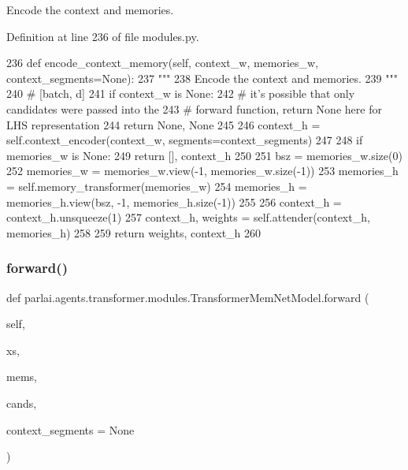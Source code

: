 \begin{DoxyVerb}Encode the context and memories.
\end{DoxyVerb}
 

Definition at line 236 of file modules.\+py.


\begin{DoxyCode}
236     \textcolor{keyword}{def }encode\_context\_memory(self, context\_w, memories\_w, context\_segments=None):
237         \textcolor{stringliteral}{"""}
238 \textcolor{stringliteral}{        Encode the context and memories.}
239 \textcolor{stringliteral}{        """}
240         \textcolor{comment}{# [batch, d]}
241         \textcolor{keywordflow}{if} context\_w \textcolor{keywordflow}{is} \textcolor{keywordtype}{None}:
242             \textcolor{comment}{# it's possible that only candidates were passed into the}
243             \textcolor{comment}{# forward function, return None here for LHS representation}
244             \textcolor{keywordflow}{return} \textcolor{keywordtype}{None}, \textcolor{keywordtype}{None}
245 
246         context\_h = self.context\_encoder(context\_w, segments=context\_segments)
247 
248         \textcolor{keywordflow}{if} memories\_w \textcolor{keywordflow}{is} \textcolor{keywordtype}{None}:
249             \textcolor{keywordflow}{return} [], context\_h
250 
251         bsz = memories\_w.size(0)
252         memories\_w = memories\_w.view(-1, memories\_w.size(-1))
253         memories\_h = self.memory\_transformer(memories\_w)
254         memories\_h = memories\_h.view(bsz, -1, memories\_h.size(-1))
255 
256         context\_h = context\_h.unsqueeze(1)
257         context\_h, weights = self.attender(context\_h, memories\_h)
258 
259         \textcolor{keywordflow}{return} weights, context\_h
260 
\end{DoxyCode}
\mbox{\label{classparlai_1_1agents_1_1transformer_1_1modules_1_1TransformerMemNetModel_a8c27f924c01b5017c7968b9d98969496}} 
\subsubsection{\texorpdfstring{forward()}{forward()}}
{\footnotesize\ttfamily def parlai.\+agents.\+transformer.\+modules.\+Transformer\+Mem\+Net\+Model.\+forward (\begin{DoxyParamCaption}\item[{}]{self,  }\item[{}]{xs,  }\item[{}]{mems,  }\item[{}]{cands,  }\item[{}]{context\+\_\+segments = {\ttfamily None} }\end{DoxyParamCaption})}


